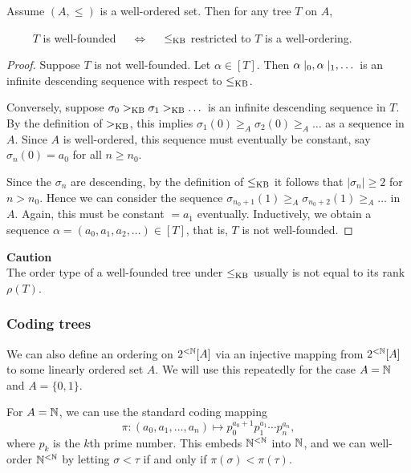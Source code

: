 \begin{proposition}\label{prop-kb-wellorder}Assume $(A,\leq)$ is a well-ordered set. Then for any tree $T$ on $A$,

$\qquad$ $T$ is well-founded $\quad \Leftrightarrow \quad$  $\leq_{\operatorname{KB}}$ restricted to $T$ is a well-ordering.

\end{proposition}\begin{proof}Suppose $T$ is not well-founded. Let $\alpha \in [T]$. Then $\alpha\mid_{0}, \alpha\mid_{1}, \dots$ is an infinite descending sequence with respect to $\leq_{\operatorname{KB}}$.

Conversely, suppose $\sigma_0 >_{\operatorname{KB}} \sigma_1 >_{\operatorname{KB}} \dots$ is an infinite descending sequence in $T$. By the definition of $>_{\operatorname{KB}}$, this implies $\sigma_1(0) \geq_A \sigma_2(0) \geq_A \dots$ as a sequence in $A$. Since $A$ is well-ordered, this sequence must eventually be constant, say $\sigma_n(0) = a_0$ for all $n \geq n_0$.

Since the $\sigma_n$ are descending, by the definition of $\leq_{\operatorname{KB}}$ it follows that $|\sigma_n| \geq 2$ for $n > n_0$. Hence we can consider the sequence $\sigma_{n_0+1}(1) \geq_A \sigma_{n_0+2}(1) \geq_A  \dots$ in $A$. Again, this must be constant $= a_1$ eventually. Inductively, we obtain a sequence $\alpha = (a_0, a_1, a_2, \dots) \in [T]$, that is, $T$ is not well-founded.

\end{proof}\begin{framed}
\textbf{Caution}\\
The order type of a well-founded tree under $\leq_{\operatorname{KB}}$ usually is not equal to its rank $\rho(T)$.
\end{framed}

\subsubsection{Coding trees}

We can also define an ordering on $2^{<\mathbb{N}}[A]$ via an injective mapping from $2^{<\mathbb{N}}[A]$ to some linearly ordered set $A$. We will use this repeatedly for the case $A = \mathbb{N}$ and $A = \{0,1\}$.

For $A = \mathbb{N}$, we can use the standard coding mapping
\begin{equation*}
\pi: (a_0, a_1, \dots, a_n) \mapsto p_0^{a_0+1}p_1^{a_1}\cdots p_n^{a_n},
\end{equation*}
where $p_k$ is the $k$th prime number. This embeds $\mathbb{N}^{<\mathbb{N}}$ into $\mathbb{N}$, and we can well-order $\mathbb{N}^{<\mathbb{N}}$ by letting $\sigma < \tau$ if and only if $\pi(\sigma) < \pi(\tau)$.

